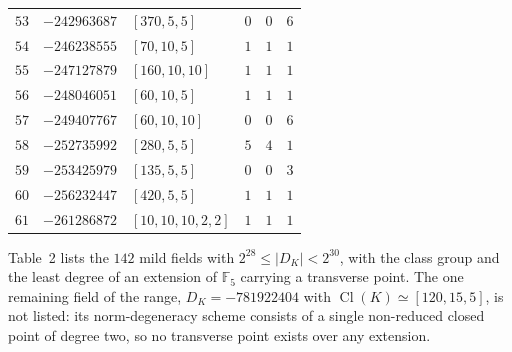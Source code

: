 \documentclass[11pt]{article}
\newcommand{\Ffive}{\mathbb F_5}
\newcommand{\Cl}{\operatorname{Cl}}
\begin{document}
\begin{center}
\begin{longtable}{r r l c c c}
$53$ & $-242963687$ & $[370,5,5]$ & $0$ & $0$ & $6$\\
$54$ & $-246238555$ & $[70,10,5]$ & $1$ & $1$ & $1$\\
$55$ & $-247127879$ & $[160,10,10]$ & $1$ & $1$ & $1$\\
$56$ & $-248046051$ & $[60,10,5]$ & $1$ & $1$ & $1$\\
$57$ & $-249407767$ & $[60,10,10]$ & $0$ & $0$ & $6$\\
$58$ & $-252735992$ & $[280,5,5]$ & $5$ & $4$ & $1$\\
$59$ & $-253425979$ & $[135,5,5]$ & $0$ & $0$ & $3$\\
$60$ & $-256232447$ & $[420,5,5]$ & $1$ & $1$ & $1$\\
$61$ & $-261286872$ & $[10,10,10,2,2]$ & $1$ & $1$ & $1$\\
\end{longtable}
\end{center}



Table~2 lists the $142$ mild fields with $2^{28}\le|D_K|<2^{30}$,
with the class group and the least degree of an extension of
$\Ffive$ carrying a transverse point.  The one remaining field of
the range, $D_K=-781922404$ with $\Cl(K)\simeq[120,15,5]$, is not
listed: its norm-degeneracy scheme consists of a single non-reduced
closed point of degree two, so no transverse point exists over any
extension.
\end{document}
